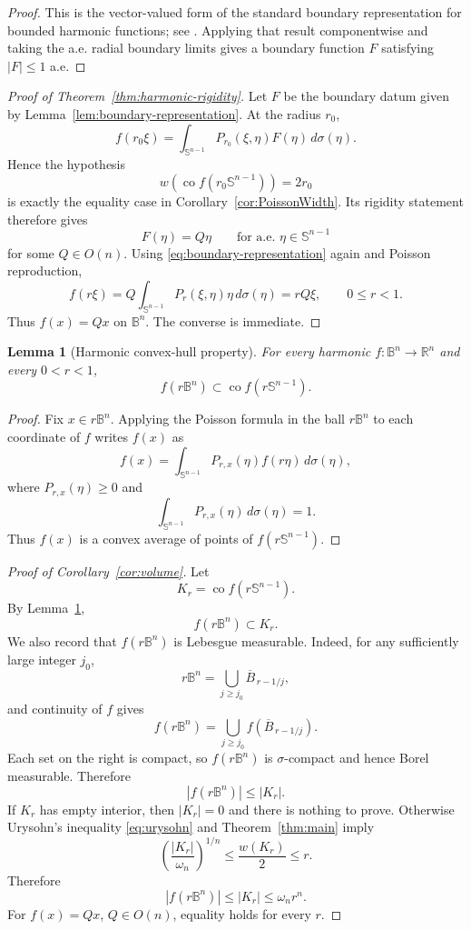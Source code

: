 \documentclass[11pt,reqno]{amsart}
\newtheorem{lemma}[theorem]{Lemma}
\theoremstyle{remark}
\begin{document}
\begin{proof}
This is the vector-valued form of the standard boundary representation for
bounded harmonic functions; see \cite[Theorem~6.13]{AxlerBourdonRamey}.
Applying that result componentwise and taking the a.e. radial boundary
limits gives a boundary function $F$ satisfying $|F|\le1$ a.e.
\end{proof}
\begin{proof}[Proof of Theorem~\ref{thm:harmonic-rigidity}]
Let $F$ be the boundary datum given by
Lemma~\ref{lem:boundary-representation}.  At the radius $r_0$,
\[
 f(r_0\xi)
 =
 \int_{\mathbb S^{n-1}}
 P_{r_0}(\xi,\eta)F(\eta)\,d\sigma(\eta).
\]
Hence the hypothesis
\[
 w\!\left(\operatorname{co}f(r_0\mathbb S^{n-1})\right)=2r_0
\]
is exactly the equality case in Corollary~\ref{cor:PoissonWidth}.
Its rigidity statement therefore gives
\[
 F(\eta)=Q\eta
 \qquad\text{for a.e. }\eta\in\mathbb S^{n-1}
\]
for some $Q\in O(n)$.  Using
\eqref{eq:boundary-representation} again and Poisson reproduction,
\[
 f(r\xi)
 =
 Q\int_{\mathbb S^{n-1}}P_r(\xi,\eta)\eta\,d\sigma(\eta)
 =
 rQ\xi,
 \qquad 0\le r<1.
\]
Thus $f(x)=Qx$ on $\mathbb B^n$.  The converse is immediate.
\end{proof}
\begin{lemma}[Harmonic convex-hull property]\label{lem:convexhull}
For every harmonic $f:\mathbb B^n\to\mathbb R^n$ and every $0<r<1$,
\[
 f(r\mathbb B^n)
 \subset
 \operatorname{co}f(r\mathbb S^{n-1}).
\]
\end{lemma}

\begin{proof}
Fix $x\in r\mathbb B^n$.  Applying the Poisson formula in the ball
$r\mathbb B^n$ to each coordinate of $f$ writes $f(x)$ as
\[
 f(x)
 =
 \int_{\mathbb S^{n-1}}
 P_{r,x}(\eta)f(r\eta)\,d\sigma(\eta),
\]
where $P_{r,x}(\eta)\ge0$ and
\[
 \int_{\mathbb S^{n-1}}P_{r,x}(\eta)\,d\sigma(\eta)=1.
\]
Thus $f(x)$ is a convex average of points of $f(r\mathbb S^{n-1})$.
\end{proof}

\begin{proof}[Proof of Corollary~\ref{cor:volume}]
Let
\[
 K_r=\operatorname{co}f(r\mathbb S^{n-1}).
\]
By Lemma~\ref{lem:convexhull},
\[
 f(r\mathbb B^n)\subset K_r.
\]
We also record that $f(r\mathbb B^n)$ is Lebesgue measurable.  Indeed, for
any sufficiently large integer $j_0$,
\[
 r\mathbb B^n
 =
 \bigcup_{j\ge j_0}\overline{B}_{\,r-1/j},
\]
and continuity of $f$ gives
\[
 f(r\mathbb B^n)
 =
 \bigcup_{j\ge j_0}
 f\!\left(\overline{B}_{\,r-1/j}\right).
\]
Each set on the right is compact, so $f(r\mathbb B^n)$ is
$\sigma$-compact and hence Borel measurable.  Therefore
\[
 |f(r\mathbb B^n)|\le|K_r|.
\]
If $K_r$ has empty interior, then $|K_r|=0$ and there is nothing to prove.
Otherwise Urysohn's inequality \eqref{eq:urysohn} and
Theorem~\ref{thm:main} imply
\[
 \left(\frac{|K_r|}{\omega_n}\right)^{1/n}
 \le
 \frac{w(K_r)}2
 \le r.
\]
Therefore
\[
 |f(r\mathbb B^n)|
 \le|K_r|
 \le\omega_n r^n.
\]
For $f(x)=Qx$, $Q\in O(n)$, equality holds for every $r$.
\end{proof}
\end{document}
